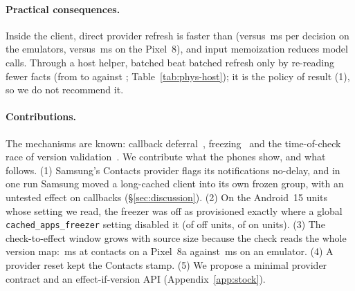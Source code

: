 \paragraph{Practical consequences.} Inside the client, direct provider refresh is faster than \stamp (\CostGl versus \CostLm\,ms per decision on the emulators, \PhysCostGl versus \PhysCostLm\,ms on the Pixel~8), and input memoization reduces model calls. Through a host helper, batched \stamp beat batched refresh only by re-reading fewer facts (from \PhysHostReadsStampMin to \PhysHostReadsStampMax against \PhysHostReadsRefresh; Table~\ref{tab:phys-host}); it is the policy of result (1), so we do not recommend it.

\paragraph{Contributions.} The mechanisms are known: callback deferral~\cite{aosp_contentservice}, freezing~\cite{android_freezer} and the time-of-check race of version validation~\cite{gray1989leases,howard1988afs,rfc9110,rfc6578}. We contribute what the phones show, and what follows. (1) Samsung's Contacts provider flags its notifications no-delay, and in one run Samsung moved a long-cached client into its own frozen group, with an untested effect on callbacks (\S\ref{sec:discussion}). (2) On the \PhysFreezerCfgShown Android~15 units whose setting we read, the freezer was off as provisioned exactly where a global \texttt{cached\_apps\_freezer} setting disabled it (\PhysFreezerCfgOffDisabled of off units, \PhysFreezerCfgOnDisabled of on units). (3) The check-to-effect window grows with source size because the check reads the whole version map: \PhysEightAScaleFiveKCte\,ms at \PhysEightAScaleFiveKRaw contacts on a Pixel~8a against \ScaleContactsFivezerozerozeroCte\,ms on an emulator. (4) A provider reset kept the Contacts stamp. (5) We propose a minimal provider contract and an effect-if-version API (Appendix~\ref{app:stock}).
